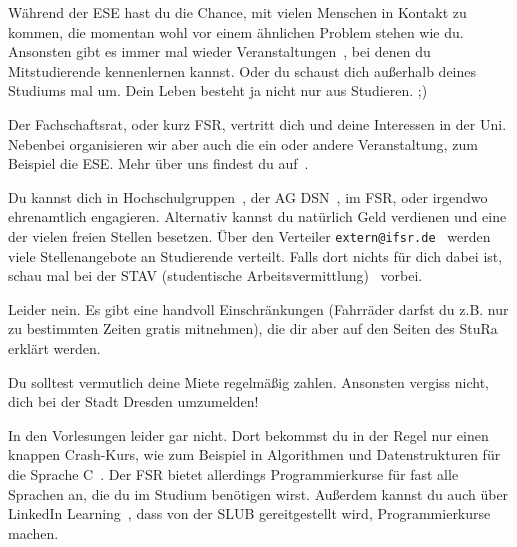 Während der ESE hast du die Chance, mit vielen Menschen in Kontakt zu kommen, die momentan wohl vor einem ähnlichen Problem stehen wie du.
Ansonsten gibt es immer mal wieder Veranstaltungen~, bei denen du Mitstudierende kennenlernen kannst.
Oder du schaust dich außerhalb deines Studiums mal um. Dein Leben besteht ja nicht nur aus Studieren. ;)

Der Fachschaftsrat, oder kurz FSR, vertritt dich und deine Interessen in der Uni. Nebenbei organisieren wir aber auch die ein oder andere Veranstaltung, zum Beispiel die ESE. Mehr über uns findest du auf~.

Du kannst dich in Hochschulgruppen~, der AG DSN~, im FSR, oder irgendwo ehrenamtlich engagieren. Alternativ kannst du natürlich Geld verdienen und eine der vielen freien Stellen besetzen. Über den Verteiler \texttt{extern@ifsr.de}~ werden viele Stellenangebote an Studierende verteilt. Falls dort nichts für dich dabei ist, schau mal bei der STAV (studentische Arbeitsvermittlung)~ vorbei.

Leider nein. Es gibt eine handvoll Einschränkungen (Fahrräder darfst du z.B. nur zu bestimmten Zeiten gratis mitnehmen), die dir aber auf den Seiten des StuRa~ erklärt werden.

Du solltest vermutlich deine Miete regelmäßig zahlen. Ansonsten vergiss nicht, dich bei der Stadt Dresden umzumelden! 

In den Vorlesungen leider gar nicht. Dort bekommst du in der Regel nur einen knappen Crash-Kurs, wie zum Beispiel in Algorithmen und Datenstrukturen für die Sprache C~.
Der FSR bietet allerdings Programmierkurse für fast alle Sprachen an, die du im Studium benötigen wirst.  Außerdem kannst du auch über LinkedIn Learning~, dass von der SLUB gereitgestellt wird, Programmierkurse machen.

